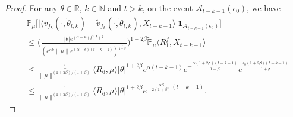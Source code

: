 \documentclass[12pt,oneside,english]{amsart}
\theoremstyle{plain}
\theoremstyle{definition}
\numberwithin{equation}{section}
\begin{document}
\begin{proof}
For any $\theta\in \mathbb{R}$, $k\in \mathbb{N}$ and $t>k$, on the event $\mathcal{A}_{t-k-1}(\epsilon_0)$, we have
    \begin{align*}
        &\mathbb{P}_{\mu}\big[\big|\langle v_{f_k}(\cdot,\tilde{\theta}_{t,k})-\tilde{v}_{f_k}(\cdot,\tilde{\theta}_{t,k}), X_{t-k-1}\rangle\big|\mathbf{1}_{\mathcal{A}_{t-k-1}(\epsilon_0)}\big]
        \\ &\leq \Big(\frac{|\theta|e^{(\alpha-\kappa(f)b)k}}{(e^{\alpha k}\|\mu\|e^{(\alpha-\epsilon)(t-k-1)})^\frac{1}{1+\beta}}\Big)^{1+2\beta}\mathbb{\tilde{P}}_{\mu}\langle R^f_1,X_{t-k-1}\rangle\\
        &\leq\frac{1}{\|\mu\|^{(1+2\beta)/(1+\beta)}}\langle R_6,\mu\rangle|\theta|^{1+2\beta}e^{\alpha(t-k-1)} e^{-\frac{\alpha(1+2\beta)(t-k-1)}{1+\beta}}e^{\frac{\epsilon_0(1+2\beta)(t-k-1)}{1+\beta}}\\
        &\leq \frac{1}{\|\mu\|^{(1+2\beta)/(1+\beta)}}\langle R_6,\mu\rangle|\theta|^{1+2\beta}e^{-\frac{\alpha\beta}{2(1+\beta)}(t-k-1)}.
    \end{align*}
\end{proof}
\end{document}
